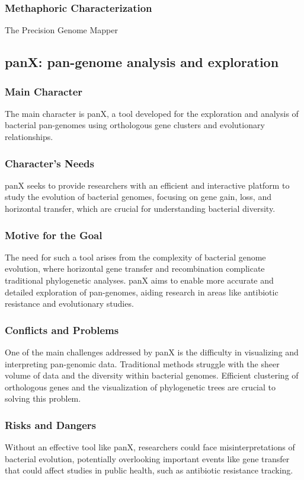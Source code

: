 \subsubsection{Methaphoric Characterization}
The Precision Genome Mapper



\subsection{panX: pan-genome analysis and exploration}
\subsubsection{Main Character}
The main character is panX, a tool developed for the exploration and analysis of bacterial pan-genomes using orthologous gene clusters and evolutionary relationships.

\subsubsection{Character's Needs}
panX seeks to provide researchers with an efficient and interactive platform to study the evolution of bacterial genomes, focusing on gene gain, loss, and horizontal transfer, which are crucial for understanding bacterial diversity.

\subsubsection{Motive for the Goal}
The need for such a tool arises from the complexity of bacterial genome evolution, where horizontal gene transfer and recombination complicate traditional phylogenetic analyses. panX aims to enable more accurate and detailed exploration of pan-genomes, aiding research in areas like antibiotic resistance and evolutionary studies.

\subsubsection{Conflicts and Problems}
One of the main challenges addressed by panX is the difficulty in visualizing and interpreting pan-genomic data. Traditional methods struggle with the sheer volume of data and the diversity within bacterial genomes. Efficient clustering of orthologous genes and the visualization of phylogenetic trees are crucial to solving this problem.

\subsubsection{Risks and Dangers}
Without an effective tool like panX, researchers could face misinterpretations of bacterial evolution, potentially overlooking important events like gene transfer that could affect studies in public health, such as antibiotic resistance tracking.

